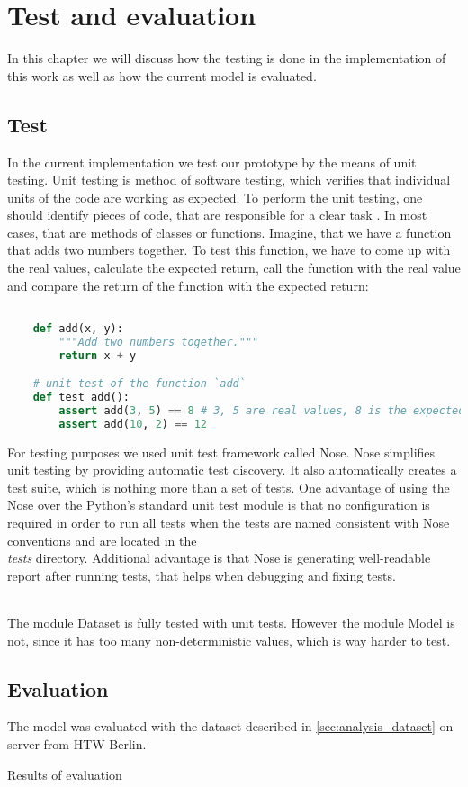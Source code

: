 \chapter{Test and evaluation}
In this chapter we will discuss how the testing is done
in the implementation of this work as well as how
the current model is evaluated.
\section{Test}
In the current implementation we test our prototype by the means
of unit testing. Unit testing is method of software testing,
which verifies that individual units of the code are working
as expected. To perform the unit testing, one should identify
pieces of code, that are responsible for a clear task \cite{Huizinga2007}.
In most cases,
that are methods of classes or functions. Imagine, that we have
a function that adds two numbers together. To test this function,
we have to come up with the real values, calculate the expected
return, call the function with the real value and compare
the return of the function with the expected return:

\begin{lstlisting}[language=Python, caption={TensorFlow example \cite{tensorflow2015-whitepaper}},label={list:test_ex}]

	def add(x, y):
		"""Add two numbers together."""
		return x + y

	# unit test of the function `add`
	def test_add():
		assert add(3, 5) == 8 # 3, 5 are real values, 8 is the expected return
		assert add(10, 2) == 12
\end{lstlisting}

For testing purposes we
used unit test framework called Nose. Nose simplifies unit testing
by providing automatic test discovery. It also automatically creates a test suite,
which is nothing more than a set of tests. One advantage of using the Nose
over the Python’s standard unit test module is that no configuration is required
in order to run all tests when the tests are named consistent with Nose conventions
and are located in the \emph{\\tests} directory. Additional advantage is that
Nose is generating well-readable report after running tests, that helps
when debugging and fixing tests.
\subparagraph{} The module Dataset is fully tested with unit tests. However
the module Model is not, since it has too many non-deterministic values, which
is way harder to test.

\section{Evaluation} The model was evaluated with the dataset described
in \autoref{sec:analysis_dataset} on server from HTW Berlin.

Results of evaluation
